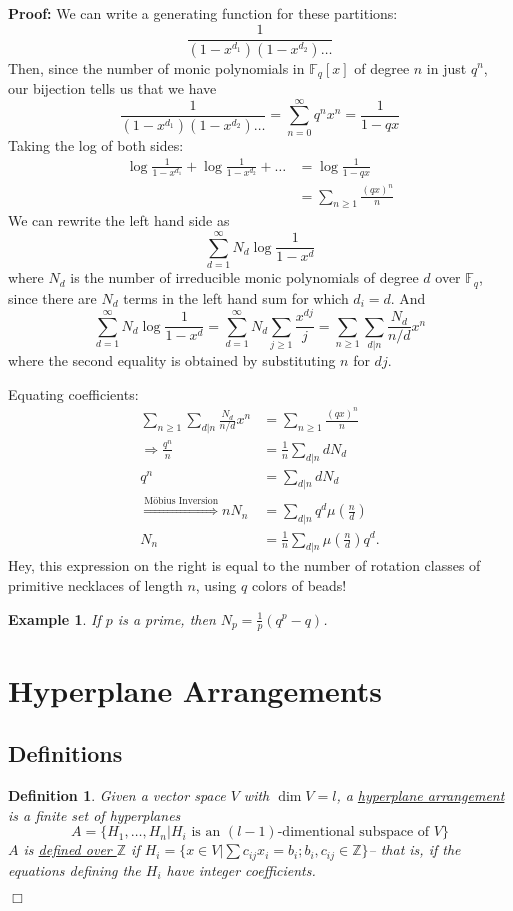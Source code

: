 \documentclass[11pt]{article}
\newtheorem{definition}[theorem]{Definition}
\newtheorem{example}[theorem]{Example}
\newenvironment{proof}{\noindent \textbf{Proof:}}{$\Box$}
\newcommand{\Z}{\mathbb Z}  %
\newcommand{\F}{\mathbb F} %
\newcommand{\und}[1]{\underline{#1}}
\begin{document}
\begin{proof}
We can write a generating function for these partitions: $$\frac{1}{(1-x^{d_1})(1-x^{d_2})\ldots}$$
Then, since the number of monic polynomials in $\F_q[x]$ of degree $n$ in just $q^n$, our bijection tells us that we have
$$\frac{1}{(1-x^{d_1})(1-x^{d_2})\ldots} = \sum_{n=0}^\infty q^n x^n = \frac{1}{1-qx}$$
%
Taking the log of both sides:
\begin{align*}
\log \frac{1}{1-x^{d_1}} + \log \frac{1}{1-x^{d_2}} + \ldots &= \log \frac{1}{1-qx} \\
&= \sum_{n\ge 1} \frac{(qx)^n}{n}
\end{align*}
We can rewrite the left hand side as $$\sum_{d=1}^\infty N_d \log \frac{1}{1-x^d}$$ where $N_d$ is the number of irreducible monic polynomials of degree $d$ over $\F_q$, since there are $N_d$ terms in the left hand sum for which $d_i = d$. And
$$\sum_{d=1}^\infty N_d \log \frac{1}{1-x^d} = \sum_{d=1}^\infty N_d \sum_{j \ge 1} \frac{x^{dj}}{j} = \sum_{n\ge 1} \sum_{d|n} \frac{N_d}{n/d}x^n$$
where the second equality is obtained by substituting $n$ for $dj$.

Equating coefficients:
\begin{align*}
\sum_{n\ge 1} \sum_{d|n} \frac{N_d}{n/d}x^n &= \sum_{n\ge 1} \frac{(qx)^n}{n} \\
\Longrightarrow \frac{q^n}{n} &= \frac{1}{n} \sum_{d|n} {d N_d} \\
q^n &= \sum_{d|n} dN_d \\
\stackrel{\text{M\"{o}bius Inversion}}{\Longrightarrow} nN_n &= 
\sum_{d|n}q^d \mu(\frac{n}{d}) \\
N_n &= \frac{1}{n} \sum_{d|n} \mu\left(\frac{n}{d}\right) q^d.
\end{align*}
Hey, this expression on the right is equal to the number of rotation classes of primitive necklaces of length $n$, using $q$ colors of beads!

\begin{example}
If $p$ is a prime, then $N_p = \frac{1}{p}(q^p -q)$.
\end{example}

\section{Hyperplane Arrangements}
\subsection{Definitions}
\begin{definition}
	Given a vector space $V$ with $\dim V = l$, a \und{hyperplane arrangement} is a finite set of hyperplanes
	$$ A = \{ H_1, \ldots, H_n | H_i \text{ is an } (l-1) \text{-dimentional subspace of } V \}$$
	$A$ is \und{defined over $\Z$} if $H_i = \{ x \in V | \sum c_{ij} x_i = b_i; b_i, c_{ij} \in \Z \}$-- that is, if the equations defining the $H_i$ have integer coefficients.
\end{definition}


\end{proof}
\end{document}
